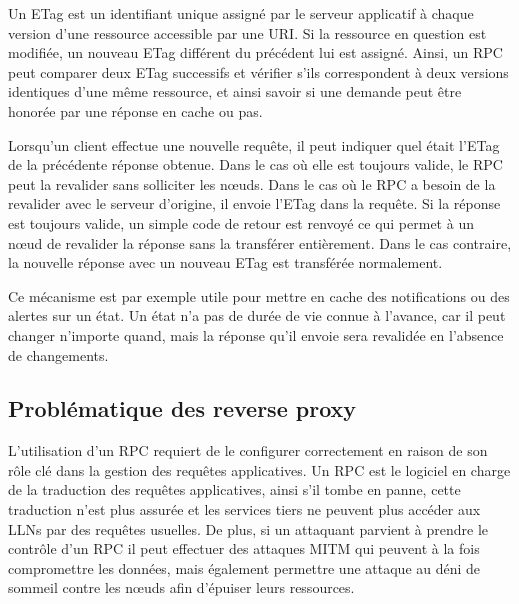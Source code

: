 Un \ac{ETag} est un identifiant unique assigné par le serveur applicatif à chaque version d'une ressource accessible par une \ac{URI}. 
Si la ressource en question est modifiée, un nouveau \ac{ETag} différent du précédent lui est assigné. 
Ainsi, un \ac{RPC} peut comparer deux \ac{ETag} successifs et vérifier s'ils correspondent à deux versions identiques d'une même ressource, et ainsi savoir si une demande peut être honorée par une réponse en cache ou pas.

Lorsqu'un client effectue une nouvelle requête, il peut indiquer quel était l'\ac{ETag} de la précédente réponse obtenue.
Dans le cas où elle est toujours valide, le \ac{RPC} peut la revalider sans solliciter les nœuds.
Dans le cas où le \ac{RPC} a besoin de la revalider avec le serveur d'origine, il envoie l'\ac{ETag} dans la requête.
Si la réponse est toujours valide, un simple code de retour est renvoyé ce qui permet à un nœud de revalider la réponse sans la transférer entièrement.
Dans le cas contraire, la nouvelle réponse avec un nouveau \ac{ETag} est transférée normalement.

Ce mécanisme est par exemple utile pour mettre en cache des notifications ou des alertes sur un état.
Un état n'a pas de durée de vie connue à l'avance, car il peut changer n'importe quand, mais la réponse qu'il envoie sera revalidée en l'absence de changements.

\subsection{Problématique des reverse proxy}

L'utilisation d'un \ac{RPC} requiert de le configurer correctement en raison de son rôle clé dans la gestion des requêtes applicatives.
Un \ac{RPC} est le logiciel en charge de la traduction des requêtes applicatives, ainsi s'il tombe en panne, cette traduction n'est plus assurée et les services tiers ne peuvent plus accéder aux \ac{LLN}s par des requêtes usuelles.
De plus, si un attaquant parvient à prendre le contrôle d'un \ac{RPC} il peut effectuer des attaques \ac{MITM} qui peuvent à la fois compromettre les données, mais également permettre une attaque au déni de sommeil contre les nœuds afin d'épuiser leurs ressources.

